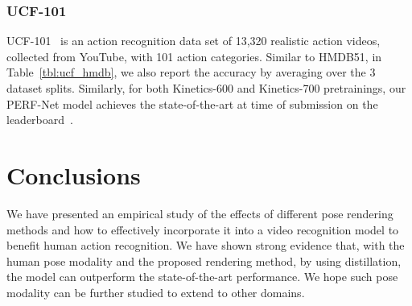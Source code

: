 \documentclass[10pt,twocolumn,letterpaper]{article}
\begin{document}
\subsubsection{UCF-101}
UCF-101~\cite{ucf101_paper} is an action recognition data set of 13,320 realistic action videos, collected from YouTube, with 101 action categories. Similar to HMDB51, in Table~\ref{tbl:ucf_hmdb}, we also report the accuracy by averaging over the 3 dataset splits. Similarly, for both Kinetics-600 and Kinetics-700 pretrainings, our PERF-Net model achieves the state-of-the-art at time of submission on the leaderboard~\cite{ucf_leaderboard}.























\section{Conclusions}
We have presented an empirical study of the effects of different pose rendering methods and how to effectively incorporate it into a video recognition model to benefit human action recognition. We have shown strong evidence that, with the human pose modality and the proposed rendering method, by using distillation, the model can outperform the state-of-the-art performance. We hope such pose modality can be further studied to extend to other domains.









\clearpage


{\small


}
\end{document}
